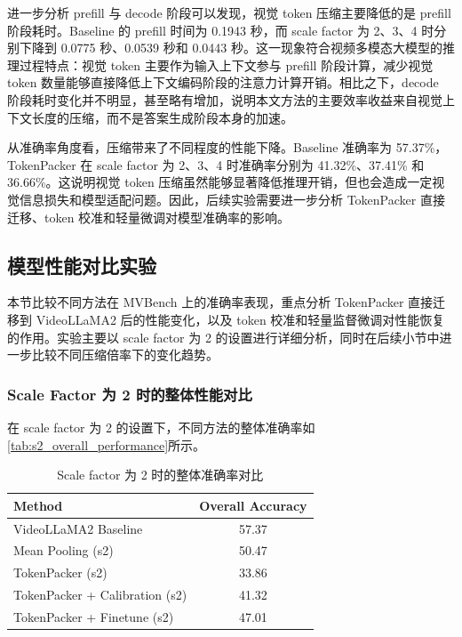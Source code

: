 进一步分析 prefill 与 decode 阶段可以发现，视觉 token 压缩主要降低的是 prefill 阶段耗时。Baseline 的 prefill 时间为 0.1943 秒，而 scale factor 为 2、3、4 时分别下降到 0.0775 秒、0.0539 秒和 0.0443 秒。这一现象符合视频多模态大模型的推理过程特点：视觉 token 主要作为输入上下文参与 prefill 阶段计算，减少视觉 token 数量能够直接降低上下文编码阶段的注意力计算开销。相比之下，decode 阶段耗时变化并不明显，甚至略有增加，说明本文方法的主要效率收益来自视觉上下文长度的压缩，而不是答案生成阶段本身的加速。

从准确率角度看，压缩带来了不同程度的性能下降。Baseline 准确率为 57.37\%，TokenPacker 在 scale factor 为 2、3、4 时准确率分别为 41.32\%、37.41\% 和 36.66\%。这说明视觉 token 压缩虽然能够显著降低推理开销，但也会造成一定视觉信息损失和模型适配问题。因此，后续实验需要进一步分析 TokenPacker 直接迁移、token 校准和轻量微调对模型准确率的影响。

\subsection{模型性能对比实验}

本节比较不同方法在 MVBench 上的准确率表现，重点分析 TokenPacker 直接迁移到 VideoLLaMA2 后的性能变化，以及 token 校准和轻量监督微调对性能恢复的作用。实验主要以 scale factor 为 2 的设置进行详细分析，同时在后续小节中进一步比较不同压缩倍率下的变化趋势。

\subsubsection{Scale Factor 为 2 时的整体性能对比}

在 scale factor 为 2 的设置下，不同方法的整体准确率如\autoref{tab:s2_overall_performance}所示。

\begin{table}[!htbp]
    \centering
    \caption{\label{tab:s2_overall_performance}Scale factor 为 2 时的整体准确率对比}
    \begin{tabular}{l c}
        \toprule
        Method & Overall Accuracy \\
        \midrule
        VideoLLaMA2 Baseline & 57.37 \\
        Mean Pooling (s2) & 50.47 \\
        TokenPacker (s2) & 33.86 \\
        TokenPacker + Calibration (s2) & 41.32 \\
        TokenPacker + Finetune (s2) & 47.01 \\
        \bottomrule
    \end{tabular}
\end{table}

